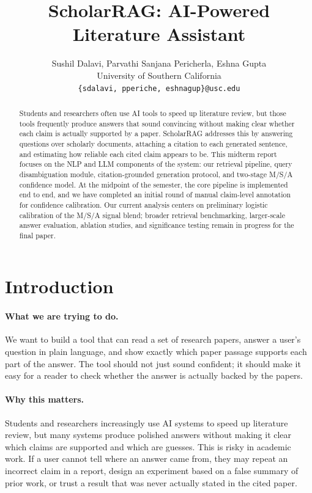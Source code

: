 \documentclass[10pt]{article}
\title{ScholarRAG: AI-Powered Literature Assistant}
\author{
Sushil Dalavi, Parvathi Sanjana Pericherla, Eshna Gupta \\
University of Southern California \\
\texttt{\{sdalavi, pperiche, eshnagup\}@usc.edu}
}
\begin{document}
\maketitle

\begin{abstract}
Students and researchers often use AI tools to speed up literature
review, but those tools frequently produce answers that sound
convincing without making clear whether each claim is actually
supported by a paper. ScholarRAG addresses this by answering questions
over scholarly documents, attaching a citation to each generated
sentence, and estimating how reliable each cited claim appears to be.
This midterm report focuses on the NLP and LLM components of the
system: our retrieval pipeline, query disambiguation module,
citation-grounded generation protocol, and two-stage M/S/A confidence
model. At the midpoint of the semester, the core pipeline is
implemented end to end, and we have completed an initial round of
manual claim-level annotation for confidence calibration. Our current
analysis centers on preliminary logistic calibration of the M/S/A
signal blend; broader retrieval benchmarking, larger-scale answer
evaluation, ablation studies, and significance testing remain in
progress for the final paper.
\end{abstract}

\section{Introduction}

\paragraph{What we are trying to do.}
We want to build a tool that can read a set of research papers, answer
a user's question in plain language, and show exactly which paper
passage supports each part of the answer. The tool should not just
sound confident; it should make it easy for a reader to check whether
the answer is actually backed by the papers.

\paragraph{Why this matters.}
Students and researchers increasingly use AI systems to speed up
literature review, but many systems produce polished answers without
making it clear which claims are supported and which are guesses. This
is risky in academic work. If a user cannot tell where an answer came
from, they may repeat an incorrect claim in a report, design an
experiment based on a false summary of prior work, or trust a result
that was never actually stated in the cited paper.
\end{document}
